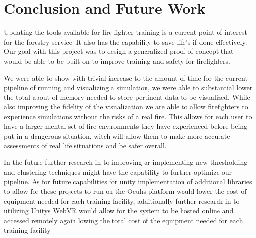 
\chapter{Conclusion and Future Work} %

\label{Chapter4} %

Updating the tools available for fire fighter training is a current point of interest for the forestry service. It also has the capability to save life's if done effectively. Our goal with this project was to design a generalized proof of concept that would be able to be built on to improve training and safety for firefighters. \par
We were able to show with trivial increase to the amount of time for the current pipeline of running and visualizing a simulation, we were able to substantial lower the total about of memory needed to store pertinent data to be visualized. While also improving the fidelity of the visualization we are able to allow firefighters to experience simulations without the risks of a real fire. This allows for each user to have a larger mental set of fire environments they have experienced before being put in a dangerous situation, witch will allow them to make more accurate assessments of real life situations and be safer overall. \par

In the future further research in to improving or implementing new thresholding and clustering techniques might have the capability to further optimize our pipeline. As for future capabilities for unity implementation of additional libraries to allow for these projects to run on the Oculis platform would lower the cost of equipment needed for each training facility, additionally further research in to utilizing Unitys WebVR would allow for the system to be hosted online and accessed remotely again lowing the total cost of the equipment needed for each training facility  

